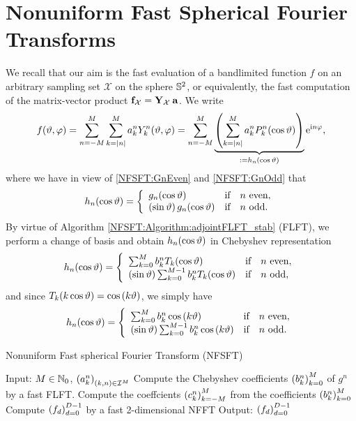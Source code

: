 \section{Nonuniform Fast Spherical Fourier Transforms}
\label{NFSFT:NFSFT}
We recall that our aim is the fast evaluation of a bandlimited function $f$ on an arbitrary sampling set $\mathcal{X}$ on 
the sphere $\mathbb{S}^2$, or equivalently, the fast computation of the matrix-vector product 
$\mathbf{f}_{\mathcal{X}} = \mathbf{Y}_{\mathcal{X}} \: \mathbf{a}$. We write
\begin{equation}
  \label{NFSFT:f}
  f{\hspace{-0.4ex}}\left(\vartheta,\varphi\right) = \sum_{n=-M}^M \sum_{k=\left\vert n\right\vert}^M a_k^n Y_{k}^n{\hspace{-0.4ex}}\left(\vartheta,\varphi\right) = 
  \sum_{n=-M}^M \underbrace{\left(\sum_{k=\left\vert n\right\vert}^M a_k^n P_{k}^n{\hspace{-0.4ex}}\left(\cos\vartheta\right)\right)}_{:= h_{n}\,{\hspace{-0.4ex}}\left(\cos\vartheta\right)} \mbox{\rm{e}}^{\mbox{\scriptsize\rm{i}} n \varphi},
\end{equation}
where we have in view of \eqref{NFSFT:GnEven} and \eqref{NFSFT:GnOdd} that
\[
  \fun{h_{n}}{\cos\vtheta} = 
    \left\{\begin{array}{l@{\quad \text{if} \quad}l}
      \fun{g_{n}}{\cos\vtheta} & n \text{ even},\\
      \paren{\sin \vtheta} \fun{g_{n}}{\cos \vtheta} & n \text{ odd}.
    \end{array}\right. 
\]
By virtue of Algorithm \ref{NFSFT:Algorithm:adjointFLFT_stab} (FLFT), we perform a change of basis 
and obtain $h_{n}{\hspace{-0.4ex}}\left(\cos\vartheta\right)$ in Chebyshev representation
\[
  \fun{h_{n}}{\cos\vtheta} = 
    \left\{\begin{array}{l@{\quad \text{if} \quad}l}
      \sum_{k=0}^{M} b_{k}^n \fun{T_{k}}{\cos\vtheta} & n \text{ even},\\
      \paren{\sin \vtheta}\sum_{k=0}^{M-1} b_{k}^n \fun{T_{k}}{\cos\vtheta} & n \text{ odd},
    \end{array}\right. 
\]
and since $T_{k}{\hspace{-0.4ex}}\left(k \cos \vartheta\right) = \cos{\hspace{-0.4ex}}\left(k \vartheta\right)$, we simply have
\[
  \fun{h_{n}}{\cos\vtheta} = 
    \left\{\begin{array}{l@{\quad \text{if} \quad}l}
      \sum_{k=0}^{M} b_{k}^n \fun{\cos}{k \vtheta} & n \text{ even},\\
      \paren{\sin \vtheta}\sum_{k=0}^{M-1} b_{k}^n \fun{\cos}{k \vtheta} & n \text{ odd}.
    \end{array}\right. 
\]
\begin{algorithm}[tb]
  \caption{Nonuniform Fast spherical Fourier Transform (NFSFT)}
  \label{NFSFT:Algorithm:NFSFT}    
  \begin{algorithmic}
    \STATE Input:  $M \in \mathbb{N}_{0}$, $\left(a_k^n\right)_{(k,n) \in \mathcal{I}^M}$
      \STATE Compute the Chebyshev coefficients $\left(b_{k}^n\right)_{k=0}^{M}$ of $g^{n}$ by a fast FLFT.
      \STATE Compute the coeffcients $\left(c_{k}^n\right)_{k=-M}^M$ from the coefficients $\left(b_{k}^n\right)_{k=0}^{M}$ 
    \ENDFOR
    \STATE Compute $\left(f_{d}\right)_{d=0}^{D-1}$ by a fast 2-dimensional NFFT
    \STATE Output: $\left(f_{d}\right)_{d=0}^{D-1}$
\end{algorithmic}
\end{algorithm}
